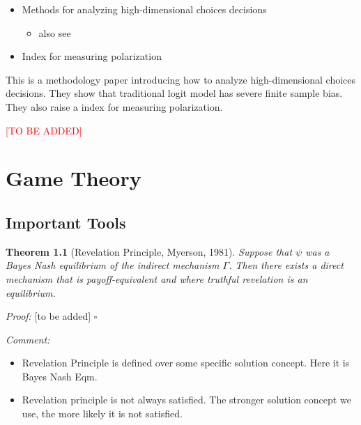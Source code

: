 \documentclass{book}
\theoremstyle{plain}
\newtheorem{thm}{Theorem}[section] %
\theoremstyle{definition}
\newenvironment{myproof}
{\noindent\textit{Proof:}}{\hfill$\square$}
\begin{document}
\textbf{}

\begin{itemize}
	\item Methods for analyzing high-dimensional choices decisions
	\begin{itemize}
		\item also see 
	\end{itemize}
	\item Index for measuring polarization
\end{itemize}


This is a methodology paper introducing how to analyze high-dimensional choices decisions. They show that traditional logit model has severe finite sample bias.
They also raise a index for measuring polarization.

\textcolor{red}{[TO BE ADDED]}







\chapter{Game Theory} %
\label{cha:game_theory}

\section{Important Tools} %
\label{sec:important_tools}

\begin{thm}[Revelation Principle, Myerson, 1981]
Suppose that $\psi$ was a Bayes Nash equilibrium of the indirect mechanism $\Gamma$. 
Then there exists a direct mechanism that is payoff-equivalent and where truthful revelation is an equilibrium.
\end{thm}

\begin{myproof}
[to be added]
\end{myproof}

\begin{singlespacing}
\noindent
\textit{Comment:}
\end{singlespacing}
\begin{itemize}
	\setlength{\itemsep}{0pt}
	\item Revelation Principle is defined over some specific solution concept. Here it is Bayes Nash Eqm.
	\item Revelation principle is not always satisfied. The stronger solution concept we use, the more likely it is not satisfied.
\end{itemize}
\end{document}
